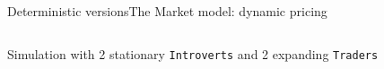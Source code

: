 \documentclass[10pt, aspectratio=169]{beamer}
\def\aa{Deterministic versions}
\def\aac{The Market model: dynamic pricing}
\begin{document}
\begin{frame}{\aa}{\aac}
  \begin{columns}
      Simulation with 2 stationary \texttt{Introverts} and 2 expanding \texttt{Traders}
    \end{columns}
\end{frame}
\end{document}

